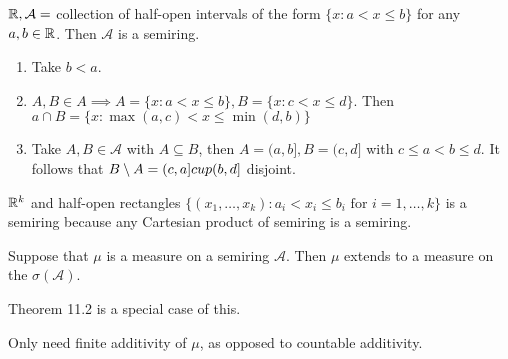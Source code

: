 \documentclass[class=article,crop=false]{standalone}
\begin{document}
\begin{eg}[]
$ \mathbb{R}, \mathcal{A}=$ collection of half-open intervals of the form $ \{x: a<x\leq b\} $ for any $ a,b \in \mathbb{R}$. Then $ \mathcal{A}$ is a semiring.
\begin{enumerate}[label=(\roman*)]
	\item Take $ b<a$.
	\item  $ A,B \in A \implies A = \{x: a< x \leq b\} , B = \{x: c<x\leq d\} $. Then $ a \cap B = \{x: \max(a,c)< x \leq \min(d,b)\} $ 
	\item Take $ A,B \in \mathcal{A}$ with $ A \subseteq B$, then $ A=(a,b], B = (c,d]$ with $ c\leq a<b\leq d$. It follows that $ B \setminus A = (c,a] \\cup (b,d]$ disjoint. 
\end{enumerate}
\end{eg}
\begin{eg}[]
	$ \mathbb{R}^{k}$ and half-open rectangles  $ \{(x_1,\ldots,x_k): a_i<x_i\leq b_i \text{ for } i=1,\ldots,k \} $ is a semiring because any Cartesian product of semiring is a semiring.
\end{eg}

\begin{thm}[11.3]
	Suppose that $ \mu$ is a measure on a semiring $ \mathcal{A}$. Then $ \mu$ extends to a measure on the $ \sigma(\mathcal{A})$.
\end{thm}
\begin{note}[]
Theorem 11.2 is a special case of this.

Only need finite additivity of $ \mu$, as opposed to countable additivity.
\end{note}
\end{document}
